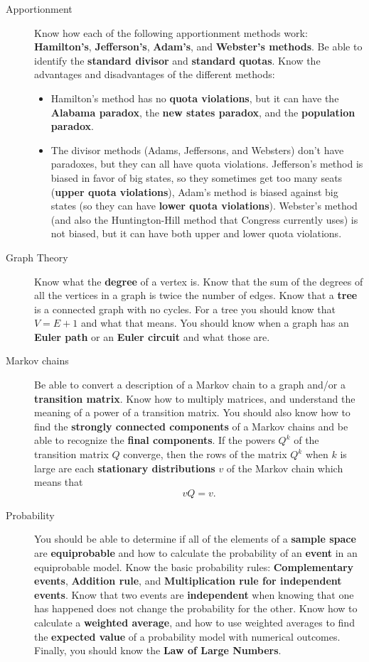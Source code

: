 \documentclass[11pt,answers]{exam}
\begin{document}
\begin{description}
\item[Apportionment] Know how each of the following apportionment methods work: \textbf{Hamilton's}, \textbf{Jefferson's}, \textbf{Adam's}, and \textbf{Webster's methods}. Be able to identify the \textbf{standard divisor} and \textbf{standard quotas}.  Know the advantages and disadvantages of the different methods:

\begin{itemize}
\item Hamilton's method has no \textbf{quota violations}, but it can have the \textbf{Alabama paradox}, the \textbf{new states paradox}, and the \textbf{population paradox}. 

\item The divisor methods (Adams, Jeffersons, and Websters) don't have paradoxes, but they can all have quota violations.  Jefferson's method is biased in favor of big states, so they sometimes get too many seats (\textbf{upper quota violations}), Adam's method is biased against big states (so they can have \textbf{lower quota violations}).  Webster's method (and also the Huntington-Hill method that Congress currently uses) is not biased, but it can have both upper and lower quota violations.  
\end{itemize}

\item[Graph Theory] Know what the \textbf{degree} of a vertex is.  Know that the sum of the degrees of all the vertices in a graph is twice the number of edges.  Know that a \textbf{tree} is a connected graph with no cycles.  For a tree you should know that $V = E+1$ and what that means.  You should know when a graph has an \textbf{Euler path} or an \textbf{Euler circuit} and what those are.  

\item[Markov chains] Be able to convert a description of a Markov chain to a graph and/or a \textbf{transition matrix}.  Know how to multiply matrices, and understand the meaning of a power of a transition matrix.  You should also know how to find the \textbf{strongly connected components} of a Markov chains and be able to recognize the \textbf{final components}.  If the powers $Q^k$ of the transition matrix $Q$ converge, then the rows of the matrix $Q^k$ when $k$ is large are each \textbf{stationary distributions} $v$ of the Markov chain which means that 
$$v Q = v.$$

\item[Probability] You should be able to determine if all of the elements of a \textbf{sample space} are \textbf{equiprobable} and how to calculate the probability of an \textbf{event} in an equiprobable model. Know the basic probability rules: \textbf{Complementary events}, \textbf{Addition rule}, and \textbf{Multiplication rule for independent events}.  Know that two events are \textbf{independent} when knowing that one has happened does not change the probability for the other. Know how to calculate a \textbf{weighted average}, and how to use weighted averages to find the \textbf{expected value} of a probability model with numerical outcomes.  Finally, you should know the \textbf{Law of Large Numbers}.   

\end{description}
\end{document}
